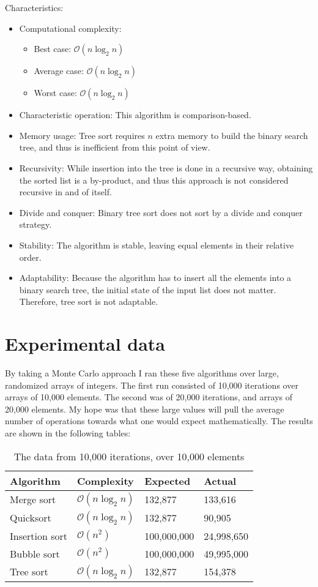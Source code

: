 \documentclass[12pt, a4paper]{article}
\begin{document}
Characteristics:
\begin{itemize}
\item Computational complexity:
\begin{itemize}
\item Best case: $\mathcal{O}(n \log_2 n)$
\item Average case: $\mathcal{O}(n \log_2 n)$
\item Worst case: $\mathcal{O}(n \log_2 n)$
\end{itemize}
\item Characteristic operation: This algorithm is comparison-based.
\item Memory usage: Tree sort requires $n$ extra memory to build the binary search tree, and thus is inefficient from this point of view.
\item Recursivity: While insertion into the tree is done in a recursive way, obtaining the sorted list is a by-product, and thus this approach is not considered recursive in and of itself.
\item Divide and conquer: Binary tree sort does not sort by a divide and conquer strategy.
\item Stability: The algorithm is stable, leaving equal elements in their relative order.
\item Adaptability: Because the algorithm has to insert all the elements into a binary search tree, the initial state of the input list does not matter. Therefore, tree sort is not adaptable.
\end{itemize}
\newpage

\section{Experimental data}

By taking a Monte Carlo approach I ran these five algorithms over large, randomized arrays of integers. The first run consisted of 10,000 iterations over arrays of 10,000 elements. The second was of 20,000 iterations, and arrays of 20,000 elements. My hope was that these large values will pull the average number of operations towards what one would expect mathematically. The results are shown in the following tables:

\begin{table}[ht!]
\begin{tabular}{|p{3cm}|p{3cm}|p{3cm}|p{3cm}|}
\hline 
Algorithm & Complexity & Expected & Actual \\ 
\hline 
Merge sort & $\mathcal{O}(n \log_2 n)$ & 132,877 & 133,616 \\ 
\hline 
Quicksort & $\mathcal{O}(n \log_2 n)$ & 132,877 & 90,905 \\ 
\hline 
Insertion sort & $\mathcal{O}(n^2)$ & 100,000,000 & 24,998,650 \\ 
\hline 
Bubble sort & $\mathcal{O}(n^2)$ & 100,000,000 & 49,995,000 \\ 
\hline 
Tree sort & $\mathcal{O}(n \log_2 n)$ & 132,877 & 154,378 \\ 
\hline 
\end{tabular} 
\caption{The data from 10,000 iterations, over 10,000 elements}
\label{table:experimentalData1}
\end{table}
\end{document}
